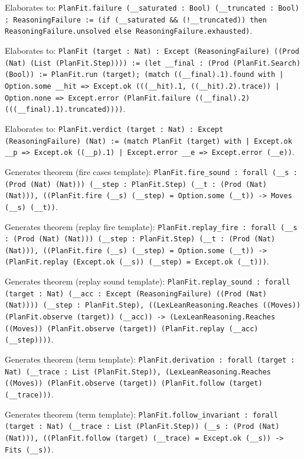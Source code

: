 \documentclass[11pt]{article}
\begin{document}
\noindent Elaborates to: \texttt{PlanFit.failure (\_\_saturated : Bool) (\_\_truncated : Bool) : ReasoningFailure := (if (\_\_saturated \&\& (!\_\_truncated)) then ReasoningFailure.unsolved else ReasoningFailure.exhausted)}.\par
\noindent Elaborates to: \texttt{PlanFit (target : Nat) : Except (ReasoningFailure) ((Prod (Nat) (List (PlanFit.Step)))) := (let \_\_final : (Prod (PlanFit.Search) (Bool)) := PlanFit.run (target); (match ((\_\_final).1).found with | Option.some \_\_hit => Except.ok (((\_\_hit).1, ((\_\_hit).2).trace)) | Option.none => Except.error (PlanFit.failure ((\_\_final).2) (((\_\_final).1).truncated))))}.\par
\noindent Elaborates to: \texttt{PlanFit.verdict (target : Nat) : Except (ReasoningFailure) (Nat) := (match PlanFit (target) with | Except.ok \_\_p => Except.ok ((\_\_p).1) | Except.error \_\_e => Except.error (\_\_e))}.\par
\noindent Generates theorem (fire cases template): \texttt{PlanFit.fire\_sound : forall (\_\_s : (Prod (Nat) (Nat))) (\_\_step : PlanFit.Step) (\_\_t : (Prod (Nat) (Nat))), ((PlanFit.fire (\_\_s) (\_\_step) = Option.some (\_\_t)) -> Moves (\_\_s) (\_\_t))}.\par
\noindent Generates theorem (replay fire template): \texttt{PlanFit.replay\_fire : forall (\_\_s : (Prod (Nat) (Nat))) (\_\_step : PlanFit.Step) (\_\_t : (Prod (Nat) (Nat))), ((PlanFit.fire (\_\_s) (\_\_step) = Option.some (\_\_t)) -> (PlanFit.replay (Except.ok (\_\_s)) (\_\_step) = Except.ok (\_\_t)))}.\par
\noindent Generates theorem (replay sound template): \texttt{PlanFit.replay\_sound : forall (target : Nat) (\_\_acc : Except (ReasoningFailure) ((Prod (Nat) (Nat)))) (\_\_step : PlanFit.Step), ((LexLeanReasoning.Reaches ((Moves)) (PlanFit.observe (target)) (\_\_acc)) -> (LexLeanReasoning.Reaches ((Moves)) (PlanFit.observe (target)) (PlanFit.replay (\_\_acc) (\_\_step))))}.\par
\noindent Generates theorem (term template): \texttt{PlanFit.derivation : forall (target : Nat) (\_\_trace : List (PlanFit.Step)), (LexLeanReasoning.Reaches ((Moves)) (PlanFit.observe (target)) (PlanFit.follow (target) (\_\_trace)))}.\par
\noindent Generates theorem (term template): \texttt{PlanFit.follow\_invariant : forall (target : Nat) (\_\_trace : List (PlanFit.Step)) (\_\_s : (Prod (Nat) (Nat))), ((PlanFit.follow (target) (\_\_trace) = Except.ok (\_\_s)) -> Fits (\_\_s))}.\par
\end{document}
